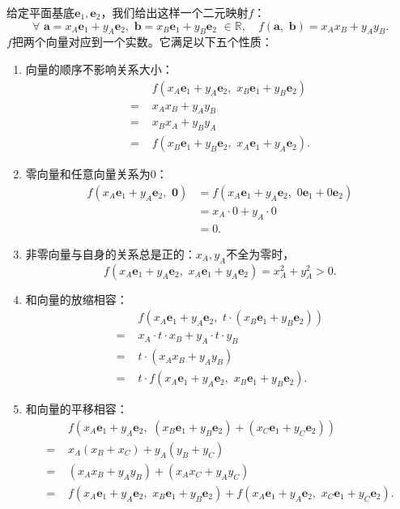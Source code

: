 \documentclass[12pt,UTF8,fontset=none]{ctexbook}
\begin{document}
给定平面基底$\mathbf{e}_1, \mathbf{e}_2$，我们给出这样一个二元映射$f$：
$$ \forall \,\, \mathbf{a} = x_A\mathbf{e}_1 + y_A\mathbf{e}_2, \,\, \mathbf{b} = x_B\mathbf{e}_1 + y_B\mathbf{e}_2 \,\, \in \mathbb{R}, \quad f(\mathbf{a}, \,\, \mathbf{b}) = x_Ax_B + y_Ay_B.$$
$f$把两个向量对应到一个实数。它满足以下五个性质：
\begin{enumerate}
    \item 向量的顺序不影响关系大小：
    \begin{align*}
          & f(x_A\mathbf{e}_1 + y_A\mathbf{e}_2,\,\, x_B\mathbf{e}_1 + y_B\mathbf{e}_2)  \\
        =\,\,& x_Ax_B + y_A y_B  \\
        =\,\,& x_Bx_A + y_By_A  \\
        =\,\,& f(x_B\mathbf{e}_1 + y_B\mathbf{e}_2,\,\, x_A\mathbf{e}_1 + y_A\mathbf{e}_2). 
    \end{align*}
    \item 零向量和任意向量关系为$0$：
    \begin{align*}
        f(x_A\mathbf{e}_1 + y_A\mathbf{e}_2,\,\, \mathbf{0}) &= f(x_A\mathbf{e}_1 + y_A\mathbf{e}_2,\,\, 0\mathbf{e}_1 + 0\mathbf{e}_2)  \\
        &= x_A\cdot 0 + y_A\cdot 0  \\
        &= 0. 
    \end{align*}
    $$$$
    \item 非零向量与自身的关系总是正的：$x_A, y_A$不全为零时，
    $$f(x_A\mathbf{e}_1 + y_A\mathbf{e}_2,\,\, x_A\mathbf{e}_1 + y_A\mathbf{e}_2) = x_A^2 + y_A^2  > 0.$$
    \item 和向量的放缩相容：
    \begin{align*}
        & f(x_A\mathbf{e}_1 + y_A\mathbf{e}_2,\,\, t\cdot (x_B\mathbf{e}_1 + y_B\mathbf{e}_2))  \\
        =\,\,& x_A\cdot t\cdot x_B + y_A\cdot t\cdot y_B  \\
        =\,\,& t\cdot (x_Ax_B + y_Ay_B)  \\
        =\,\,& t\cdot f(x_A\mathbf{e}_1 + y_A\mathbf{e}_2,\,\, x_B\mathbf{e}_1 + y_B\mathbf{e}_2).  
    \end{align*}
    \item 和向量的平移相容：
    \begin{align*}
         & f(x_A\mathbf{e}_1 + y_A\mathbf{e}_2, \,\, (x_B\mathbf{e}_1 + y_B\mathbf{e}_2) + (x_C\mathbf{e}_1 + y_C\mathbf{e}_2))  \\
         =\,\,& x_A(x_B + x_C) + y_A (y_B + y_C)  \\
         =\,\,& (x_Ax_B + y_Ay_B) + (x_Ax_C + y_Ay_C)  \\
         =\,\,& f(x_A\mathbf{e}_1 + y_A\mathbf{e}_2, \,\,x_B\mathbf{e}_1 + y_B\mathbf{e}_2) + f(x_A\mathbf{e}_1 + y_A\mathbf{e}_2, \,\,x_C\mathbf{e}_1 + y_C\mathbf{e}_2). 
    \end{align*}     
\end{enumerate}
\end{document}
